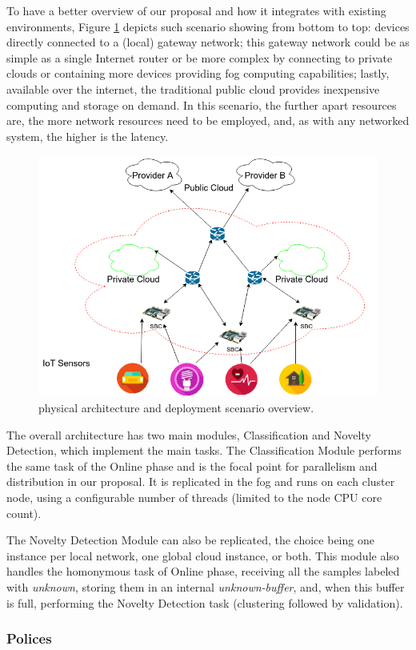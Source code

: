To have a better overview of our proposal and how it integrates with existing
\iot environments, Figure \ref{fig:mfog-phy-arch-cloud} depicts such scenario
showing from bottom to top:
\iot devices directly connected to a (local) gateway network;
this gateway network could be as simple as a single Internet router 
or be more complex by connecting to private clouds or 
containing more devices providing fog computing capabilities;
lastly, available over the internet, the traditional public cloud provides
inexpensive computing and storage on demand.
In this scenario, the further apart resources are, the more network
resources need to be employed, and, as with any networked system, the
higher is the latency.

\begin{figure}[hb]
  \centering
  \includegraphics[width=0.5\linewidth]{figures/cassalesimgs-000.png}
  \caption{\arch \cite{Cassales2019a} physical architecture and deployment scenario overview.}
  \label{fig:mfog-phy-arch-cloud}
\end{figure}

The overall \mfog architecture has two main modules, Classification and Novelty
Detection, which implement the \minas main tasks.
The Classification Module performs the same task of the \minas Online phase and
is the focal point for parallelism and distribution in our proposal.
It is replicated in the fog and runs on each cluster node, using a configurable
number of threads (limited to the node CPU core count).

The Novelty Detection Module can also be replicated,
the choice being one instance per local network, one global cloud instance,
or both.
This module also handles the homonymous task of \minas Online phase, receiving
all the samples labeled with \emph{unknown}, storing them in an internal
\emph{unknown-buffer}, and, when this buffer is full, performing the \minas
Novelty Detection task (clustering followed by validation).

\subsubsection{Polices}\label{sec:polices}

